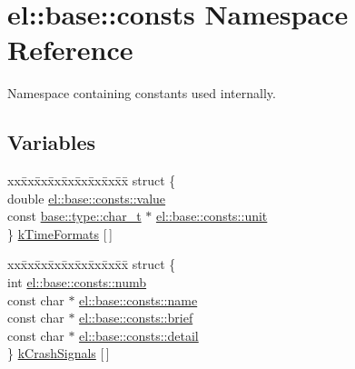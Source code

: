 \hypertarget{namespaceel_1_1base_1_1consts}{}\section{el\+:\+:base\+:\+:consts Namespace Reference}
\label{namespaceel_1_1base_1_1consts}


Namespace containing constants used internally.  


\subsection*{Variables}
\begin{DoxyCompactItemize}
\item 
\begin{tabbing}
xx\=xx\=xx\=xx\=xx\=xx\=xx\=xx\=xx\=\kill
struct \{\\
\>double \hyperlink{namespaceel_1_1base_1_1consts_a7463944511904d9ca3dd4b6933a3e6f1}{el::base::consts::value}\\
\>const \hyperlink{namespaceel_1_1base_1_1type_ae9fe1ba101c2444b8cad9a2484b54907}{base::type::char\_t} $\ast$ \hyperlink{namespaceel_1_1base_1_1consts_a0c99046e04195e209e09f90ea71dd5fd}{el::base::consts::unit}\\
\} \hyperlink{namespaceel_1_1base_1_1consts_aebf5600a219b9313965789b468416edd}{kTimeFormats} \mbox{[}$\,$\mbox{]}\\

\end{tabbing}\item 
\begin{tabbing}
xx\=xx\=xx\=xx\=xx\=xx\=xx\=xx\=xx\=\kill
struct \{\\
\>int \hyperlink{namespaceel_1_1base_1_1consts_ad500da448be26a12d4ca42afc29a1316}{el::base::consts::numb}\\
\>const char $\ast$ \hyperlink{namespaceel_1_1base_1_1consts_a190f5acd3504cafb1adeae14e95cae5f}{el::base::consts::name}\\
\>const char $\ast$ \hyperlink{namespaceel_1_1base_1_1consts_a4f2c476d5b8958d5e3e7bb9d1935dea1}{el::base::consts::brief}\\
\>const char $\ast$ \hyperlink{namespaceel_1_1base_1_1consts_a2b4b9cbcbf8c93a7e770c7d9efe33560}{el::base::consts::detail}\\
\} \hyperlink{namespaceel_1_1base_1_1consts_ae148ad63452cb04651a6abe4f6b3f39c}{kCrashSignals} \mbox{[}$\,$\mbox{]}\\

\end{tabbing}\end{DoxyCompactItemize}


